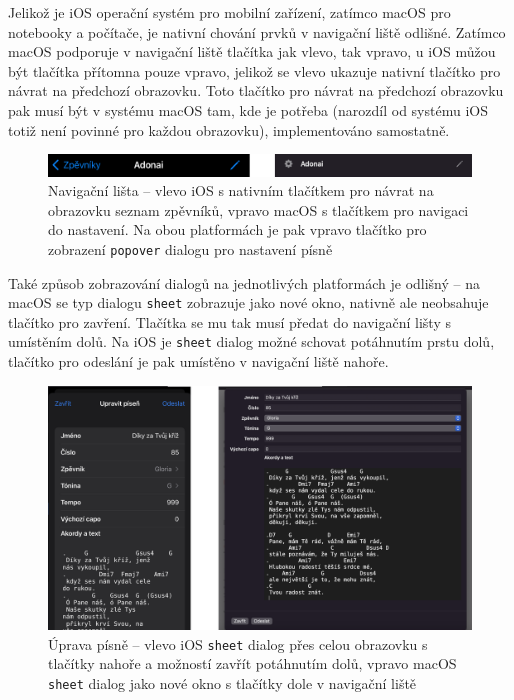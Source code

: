 Jelikož je iOS operační systém pro mobilní zařízení, zatímco macOS pro notebooky a počítače, je nativní chování prvků v navigační liště odlišné. Zatímco macOS podporuje v navigační liště tlačítka jak vlevo, tak vpravo, u iOS můžou být tlačítka přítomna pouze vpravo, jelikož se vlevo ukazuje nativní tlačítko pro návrat na předchozí obrazovku. Toto tlačítko pro návrat na předchozí obrazovku pak musí být v systému macOS tam, kde je potřeba (narozdíl od systému iOS totiž není povinné pro každou obrazovku), implementováno samostatně.

\begin{figure}[H]
    \includegraphics[width=\textwidth]{images/5-implementace/5-2-navigacni-lista.png}
    \caption[Navigační lišta -- rozdíl mezi iOS a macOS]{Navigační lišta -- vlevo iOS s nativním tlačítkem pro návrat na obrazovku seznam zpěvníků, vpravo macOS s tlačítkem pro navigaci do nastavení. Na obou platformách je pak vpravo tlačítko pro zobrazení \texttt{popover} dialogu pro nastavení písně}
\end{figure}

Také způsob zobrazování dialogů na jednotlivých platformách je odlišný -- na macOS se typ dialogu \texttt{sheet} zobrazuje jako nové okno, nativně ale neobsahuje tlačítko pro zavření. Tlačítka se mu tak musí předat do navigační lišty s umístěním dolů. Na iOS je \texttt{sheet} dialog možné schovat potáhnutím prstu dolů, tlačítko pro odeslání je pak umístěno v navigační liště nahoře.

\begin{figure}[H]
    \includegraphics[width=\textwidth]{images/5-implementace/5-3-dialog-sheet.png}
    \caption[Úprava písně -- rozdíl mezi iOS a macOS]{Úprava písně -- vlevo iOS \texttt{sheet} dialog přes celou obrazovku s tlačítky nahoře a možností zavřít potáhnutím dolů, vpravo macOS \texttt{sheet} dialog jako nové okno s tlačítky dole v navigační liště}
\end{figure}

